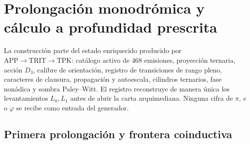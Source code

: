 \section{Prolongación monodrómica y cálculo a profundidad prescrita}
\label{sec:generacion-monodromica-certificada-rev7}

La construcción parte del estado enriquecido producido por
\(\mathrm{APP}\to\mathrm{TRIT}\to\mathrm{TPK}\): catálogo activo de
\(468\) emisiones, proyección ternaria, acción \(D_3\), calibre de
orientación, registro de transiciones de rango pleno, caracteres de
clausura, propagación y autoescala, cilindros ternarios, fase nonádica y
sombra Paley--Witt. El registro reconstruye de manera única los
levantamientos \(L_0,L_1\) antes de abrir la carta arquimediana. Ninguna
cifra de \(\pi\), \(e\) o \(\varphi\) se recibe como entrada del generador.

\subsection{Primera prolongación y frontera coinductiva}


